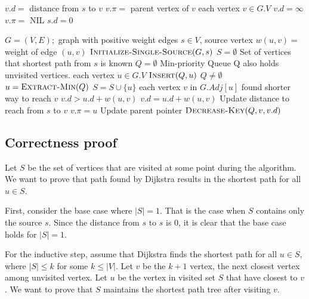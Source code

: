 \documentclass{article}
\begin{document}
\begin{codebox}
\li \Comment $v.d = $ distance from $s$ to $v$
\li \Comment $v.\pi = $ parent vertex of $v$
\li
\li \For each vertex $v \in G.V$
\li     \Do
            $v.d = \infty$
\li         $v.\pi =$ NIL
        \End
\li $s.d = 0$
\end{codebox}

\begin{codebox}
\li \Comment $G = (V,E);$ graph with positive weight edges
\li \Comment $s \in V$, source vertex
\li \Comment $w(u,v) = $ weight of edge $(u,v)$
\li
\li $\textsc{Initialize-Single-Source}(G,s)$
\li $S = \emptyset$ \hspace{0.5cm}\Comment Set of vertices that shortest path from $s$ is known  
\li $Q = \emptyset$ \hspace{0.5cm}\Comment Min-priority Queue
\li                 \hspace{1.5cm}\Comment Q also holds unvisited vertices.
\li \For each vertex $u \in G.V$
\li     \Do
            $\textsc{Insert}(Q,u)$
        \End
\li \While $Q \neq \emptyset$
\li     \Do
            $u = \textsc{Extract-Min}(Q)$
\li         $S = S \cup \{u\}$
\li     \For each vertex $v$ in $G.Adj[u]$
\li         \Do
                \Comment found shorter way to reach $v$
\li             \If $v.d > u.d + w(u,v)$
\li                 \Do
                        $v.d = u.d + w(u,v)$    \hspace{0.5cm}\Comment Update distance to reach from $s$ to $v$
\li                     $v.\pi = u$             \hspace{2.2cm}\Comment Update parent pointer
\li                     $\textsc{Decrease-Key}(Q,v,v.d)$
                    \End
            \End
        \End
\end{codebox}

\subsection{Correctness proof}
Let $S$ be the set of vertices that are visited at some point during the algorithm. We want to prove that path found by Dijkstra results in the shortest path for all $u \in S$. 

First, consider the base case where $|S| = 1$. That is the case when $S$ contains only the source $s$. Since the distance from $s$ to $s$ is 0, it is clear that the base case holds for $|S| = 1$.

For the inductive step, assume that Dijkstra finds the shortest path for all $u \in S$, where $|S| \leq k$ for some $k \leq |V|$. Let $v$ be the $k + 1$ vertex, the next closest vertex among unvisited vertex. Let $u$ be the vertex in visited set $S$ that have closest to $v$. We want to prove that $S$ maintains the shortest path tree after visiting $v$.
\end{document}
